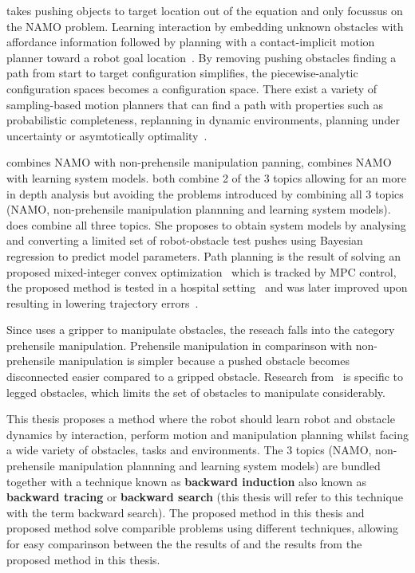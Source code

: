 \citeauthor{wang_affordancebased_2020} takes pushing objects to target location out of the equation and only focussus on the \ac{NAMO} problem. Learning interaction by embedding unknown obstacles with affordance information followed by planning with a contact-implicit motion planner toward a robot goal location~\cite{wang_affordancebased_2020}. By removing pushing obstacles finding a path from start to target configuration simplifies, the piecewise-analytic configuration spaces becomes a configuration space. There exist a variety of sampling-based motion planners that can find a path with properties such as probabilistic completeness, replanning in dynamic environments, planning under uncertainty or asymtotically optimality~\cite{karaman_samplingbased_2011,elbanhawi_samplingbased_2014}.\bs

\citeauthor{vega-brown_asymptotically_2020} combines \ac{NAMO} with non-prehensile manipulation panning, \citeauthor{wang_affordancebased_2020} combines \ac{NAMO} with learning system models. both combine 2 of the 3 topics allowing for an more in depth analysis but avoiding the problems introduced by combining all 3 topics (\ac{NAMO}, non-prehensile manipulation plannning and learning system models). \citeauthor{sabbaghnovin_model_2021} does combine all three topics. She proposes to obtain system models by analysing and converting a limited set of robot-obstacle test pushes using Bayesian regression to predict model parameters. Path planning is the result of solving an proposed mixed-integer convex optimization~\cite{sabbaghnovin_optimal_2016} which is tracked by \ac{MPC} control, the proposed method is tested in a hospital setting~\cite{novin_dynamic_2018} and was later improved upon resulting in lowering trajectory errors~\cite{sabbaghnovin_model_2021}.\bs

Since \citeauthor{sabbaghnovin_model_2021} uses a gripper to manipulate obstacles, the reseach falls into the category prehensile manipulation. Prehensile manipulation in comparinson with non-prehensile manipulation is simpler because a pushed obstacle becomes disconnected easier compared to a gripped obstacle. Research from~\cite{novin_dynamic_2018,sabbaghnovin_model_2021} is specific to legged obstacles, which limits the set of obstacles to manipulate considerably.\bs

This thesis proposes a method where the robot should learn robot and obstacle dynamics by interaction, perform motion and manipulation planning whilst facing a wide variety of obstacles, tasks and environments. The 3 topics (\ac{NAMO}, non-prehensile manipulation plannning and learning system models) are bundled together with a technique known as \textbf{backward induction} also known as \textbf{backward tracing} or \textbf{backward search} (this thesis will refer to this technique with the term backward search). The proposed method in this thesis and \citeauthor{sabbaghnovin_model_2021} proposed method solve comparible problems using different techniques, allowing for easy comparinson between the the results of \citeauthor{sabbaghnovin_model_2021} and the results from the proposed method in this thesis.\bs

